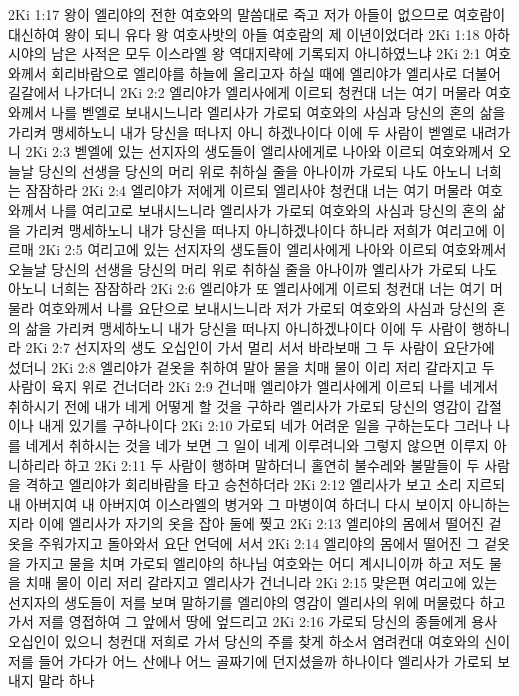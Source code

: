 2Ki 1:17  왕이 엘리야의 전한 여호와의 말씀대로 죽고 저가 아들이 없으므로 여호람이 대신하여 왕이 되니 유다 왕 여호사밧의 아들 여호람의 제 이년이었더라
2Ki 1:18  아하시야의 남은 사적은 모두 이스라엘 왕 역대지략에 기록되지 아니하였느냐
2Ki 2:1  여호와께서 회리바람으로 엘리야를 하늘에 올리고자 하실 때에 엘리야가 엘리사로 더불어 길갈에서 나가더니
2Ki 2:2  엘리야가 엘리사에게 이르되 청컨대 너는 여기 머물라 여호와께서 나를 벧엘로 보내시느니라 엘리사가 가로되 여호와의 사심과 당신의 혼의 삶을 가리켜 맹세하노니 내가 당신을 떠나지 아니 하겠나이다 이에 두 사람이 벧엘로 내려가니
2Ki 2:3  벧엘에 있는 선지자의 생도들이 엘리사에게로 나아와 이르되 여호와께서 오늘날 당신의 선생을 당신의 머리 위로 취하실 줄을 아나이까 가로되 나도 아노니 너희는 잠잠하라
2Ki 2:4  엘리야가 저에게 이르되 엘리사야 청컨대 너는 여기 머물라 여호와께서 나를 여리고로 보내시느니라 엘리사가 가로되 여호와의 사심과 당신의 혼의 삶을 가리켜 맹세하노니 내가 당신을 떠나지 아니하겠나이다 하니라 저희가 여리고에 이르매
2Ki 2:5  여리고에 있는 선지자의 생도들이 엘리사에게 나아와 이르되 여호와께서 오늘날 당신의 선생을 당신의 머리 위로 취하실 줄을 아나이까 엘리사가 가로되 나도 아노니 너희는 잠잠하라
2Ki 2:6  엘리야가 또 엘리사에게 이르되 청컨대 너는 여기 머물라 여호와께서 나를 요단으로 보내시느니라 저가 가로되 여호와의 사심과 당신의 혼의 삶을 가리켜 맹세하노니 내가 당신을 떠나지 아니하겠나이다 이에 두 사람이 행하니라
2Ki 2:7  선지자의 생도 오십인이 가서 멀리 서서 바라보매 그 두 사람이 요단가에 섰더니
2Ki 2:8  엘리야가 겉옷을 취하여 말아 물을 치매 물이 이리 저리 갈라지고 두 사람이 육지 위로 건너더라
2Ki 2:9  건너매 엘리야가 엘리사에게 이르되 나를 네게서 취하시기 전에 내가 네게 어떻게 할 것을 구하라 엘리사가 가로되 당신의 영감이 갑절이나 내게 있기를 구하나이다
2Ki 2:10  가로되 네가 어려운 일을 구하는도다 그러나 나를 네게서 취하시는 것을 네가 보면 그 일이 네게 이루려니와 그렇지 않으면 이루지 아니하리라 하고
2Ki 2:11  두 사람이 행하며 말하더니 홀연히 불수레와 불말들이 두 사람을 격하고 엘리야가 회리바람을 타고 승천하더라
2Ki 2:12  엘리사가 보고 소리 지르되 내 아버지여 내 아버지여 이스라엘의 병거와 그 마병이여 하더니 다시 보이지 아니하는지라 이에 엘리사가 자기의 옷을 잡아 둘에 찢고
2Ki 2:13  엘리야의 몸에서 떨어진 겉옷을 주워가지고 돌아와서 요단 언덕에 서서
2Ki 2:14  엘리야의 몸에서 떨어진 그 겉옷을 가지고 물을 치며 가로되 엘리야의 하나님 여호와는 어디 계시니이까 하고 저도 물을 치매 물이 이리 저리 갈라지고 엘리사가 건너니라
2Ki 2:15  맞은편 여리고에 있는 선지자의 생도들이 저를 보며 말하기를 엘리야의 영감이 엘리사의 위에 머물렀다 하고 가서 저를 영접하여 그 앞에서 땅에 엎드리고
2Ki 2:16  가로되 당신의 종들에게 용사 오십인이 있으니 청컨대 저희로 가서 당신의 주를 찾게 하소서 염려컨대 여호와의 신이 저를 들어 가다가 어느 산에나 어느 골짜기에 던지셨을까 하나이다 엘리사가 가로되 보내지 말라 하나
